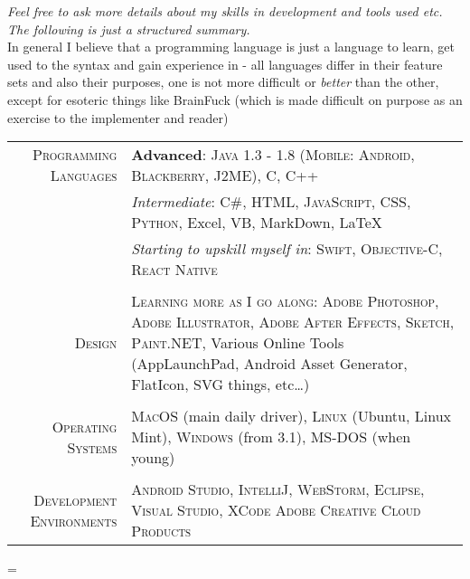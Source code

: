 \documentclass[a4paper,10pt,notitlepage]{article}
\newenvironment{absolutelynopagebreak}
  {\par\nobreak\vfil\penalty0\vfilneg
   \vtop\bgroup}
  {\par\xdef\tpd{\the\prevdepth}\egroup
   \prevdepth=\tpd}
\begin{document}
\begin{absolutelynopagebreak}
	\textit{Feel free to ask more details about my skills in development and tools used etc. The following is just a structured summary.} \\
	
	\footnotesize{In general I believe that a programming language is just a language to learn, get used to the syntax and gain experience in - all languages differ in their feature sets and also their purposes, one is not more difficult or \textit{better} than the other, except for esoteric things like BrainFuck (which is made difficult on purpose as an exercise to the implementer and reader)} \\
	
	\begin{tabular}{r|p{11cm}}
		
		\textsc{Programming Languages}    & \textbf{Advanced}: \textsc{Java 1.3 - 1.8 (Mobile: Android, Blackberry, J2ME)}, \textsc{C}, \textsc{C++} \\
		                                  & \emph{Intermediate}: \textsc{C\#}, \textsc{HTML}, \textsc{JavaScript}, \textsc{CSS}, \textsc{Python}, Excel, VB, MarkDown, {\fb \LaTeX} \setmainfont[SmallCapsFont=Fontin-SmallCaps.otf]{Fontin.otf} \\
		                                  & \emph{Starting to upskill myself in}: \textsc{Swift}, \textsc{Objective-C}, \textsc{React Native} \\
		                                  
		\multicolumn{2}{c}{}\\
		
		\textsc{Design}                   & \textsc{Learning more as I go along}: \textsc{Adobe Photoshop}, \textsc{Adobe Illustrator}, \textsc{Adobe After Effects}, \textsc{Sketch}, \textsc{Paint.NET}, Various Online Tools (AppLaunchPad, Android Asset Generator, FlatIcon, SVG things, etc\ldots) \\
		
		\multicolumn{2}{c}{}\\
		
		\textsc{Operating Systems}        & \textsc{MacOS} (main daily driver), \textsc{Linux} (Ubuntu, Linux Mint), \textsc{Windows} (from 3.1), \textsc{MS-DOS} (when young) \\
		 
		\multicolumn{2}{c}{} \\
		 
		\textsc{Development Environments} & \textsc{Android Studio}, \textsc{IntelliJ}, \textsc{WebStorm}, \textsc{Eclipse}, \textsc{Visual Studio}, \textsc{XCode} \textsc{Adobe Creative Cloud Products} \\
		 

\end{tabular}
\end{absolutelynopagebreak}
\end{document}
